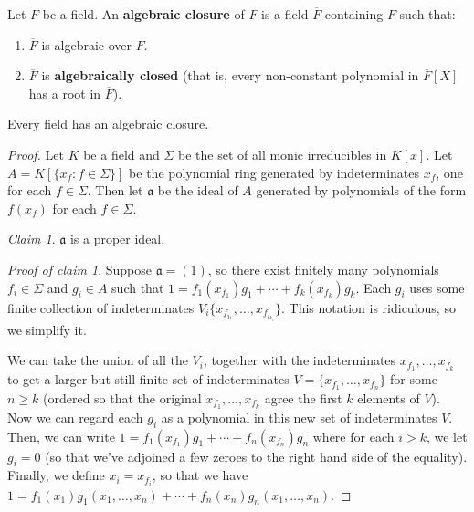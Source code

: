 \begin{definition} 
Let $F$ be a field. An \textbf{algebraic closure} of $F$ is a field
$\overline{F}$ containing $F$ such that:
\begin{enumerate}[\textbf{AC} 1]
\item $\overline{F} $ is algebraic over $F$.
\item $\overline{F}$ is \textbf{algebraically closed} (that is, every
non-constant polynomial in $\overline{F}[X]$ has a root in $\overline{F}$).
\end{enumerate}
\end{definition} 

\begin{theorem}
Every field has an algebraic closure.
\end{theorem}

\begin{proof}
Let $ K$ be a field and $ \Sigma$ be the set of all monic irreducibles in $ K[x]$. Let $ A = K[\{x_f : f \in \Sigma\}]$ be the polynomial ring generated by indeterminates $ x_f$, one for each $ f \in \Sigma$. Then let $ \mathfrak{a}$ be the ideal of $ A$ generated by polynomials of the form $ f(x_f)$ for each $ f \in \Sigma$.

\emph{Claim 1}. $ \mathfrak{a}$ is a proper ideal.

\emph{Proof of claim 1}. Suppose $ \mathfrak{a} = (1)$, so there exist finitely many polynomials $ f_i \in \Sigma$ and $ g_i \in A$ such that $ 1 = f_1(x_{f_1}) g_1 + \dotsb + f_k(x_{f_k}) g_k$. Each $ g_i$ uses some finite collection of indeterminates $ V_i \{x_{f_{i_1}}, \dotsc, x_{f_{i_{k_i}}}\}$. This notation is ridiculous, so we simplify it.

We can take the union of all the $ V_i$, together with the indeterminates $ x_{f_1}, \dotsc, x_{f_k}$ to get a larger but still finite set of indeterminates $ V = \{x_{f_1}, \dotsc, x_{f_n}\}$ for some $ n \geq k$ (ordered so that the original $ x_{f_1}, \dotsc, x_{f_k}$ agree the first $ k$ elements of $ V$). Now we can regard each $ g_i$ as a polynomial in this new set of indeterminates $ V$.
Then, we can write $ 1 = f_1(x_{f_1}) g_1 + \dotsb + f_n(x_{f_n}) g_n$ where for each $ i > k$, we let $ g_i = 0$ (so that we've adjoined a few zeroes to the right hand side of the equality).
Finally, we define $ x_i = x_{f_i}$, so that we have
$ 1 = f_1(x_1)g_1(x_1, \dotsc, x_n) + \dotsb + f_n(x_n) g_n(x_1, \dotsc, x_n)$.


\end{proof}
